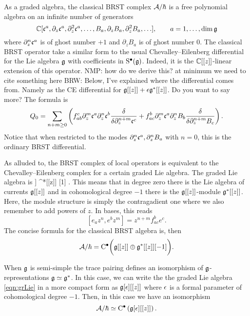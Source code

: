 \documentclass[11pt]{amsart}
\def\brian#1{{\textcolor{blue!65!red}{BRW: {#1}}}}
\def\natalie#1{{\textcolor{green!65!black}{NMP: {#1}}}}
\begin{document}
As a graded algebra, the classical BRST complex $\mathcal A / \hbar$ is a free polynomial algebra on an infinite number of generators
\[
\mathbb C[\mathfrak c^a, \partial_z \mathfrak c^a , \partial^2_z \mathfrak c^a, \ldots, B_a , \partial_z B_a , \partial_z^2 B_a, \ldots], \qquad {a=1, \ldots, \dim \mathfrak g} 
\]
where $\partial_z^n \mathfrak c^a$ is of ghost number $+1$ and $\partial_z B_a$ is of ghost number $0$. 
The classical BRST operator take a similar form to the usual Chevalley--Eilenberg differential for the Lie algebra $\mathfrak g$ with coefficients in ${\rm S}^\bullet (\mathfrak g)$. 
Indeed, it is the $\mathbb C[[z]]$-linear extension of this operator. \natalie{how do we derive this? at minimum we need to cite something here}
\brian{Below, I've explained where the differential comes from. 
Namely as the CE differential for $\mathfrak g[[z]] + \epsilon \mathfrak g^*[[z]]$.
Do you want to say more?}
The formula is
\[
Q_0 = \sum_{n +m \geq 0} \left(f_{ab}^c \partial_z^m \mathfrak c^a \partial_z^n \mathfrak c^b \frac{\delta}{\delta \partial_z^{n+m}\mathfrak c^c} + f_{ac}^b \partial_{z}^m \mathfrak c^a \partial_z^n B_b \frac{\delta}{\delta \partial_z^{n+m} B_c}\right) .
\] 
Notice that when restricted to the modes $\partial_z^n \mathfrak c^a, \partial_z^n B_a$ with $n=0$, this is the ordinary BRST differential. 

As alluded to, the BRST complex of local operators is equivalent to the Chevalley--Eilenberg complex for a certain graded Lie algebra.
The graded Lie algebra is
\beqn\label{eqn:grLie}
\fg[[z]] \oplus \fg^*[[z]] [1] .
\eeqn
This means that in degree zero there is the Lie algebra of currents $\mathfrak g[[z]]$ and in cohomological degree $-1$ there is the $\mathfrak g[[z]]$-module $\mathfrak g^*[[z]]$. 
Here, the module structure is simply the contragadient one where we also remember to add powers of $z$.
In bases, this reads
\[
[e_a z^n , e^b z^m] = z^{n+m} f_{ac}^{b} e^c  .
\]
The concise formula for the classical BRST algebra is, then
\[
\mathcal A / \hbar = {\rm C}^\bullet \bigg(\mathfrak g[[z]] \oplus \mathfrak g^*[[z]] [-1] \bigg) .
\] 

When $\mathfrak g$ is semi-simple the trace pairing defines an isomorphism of $\mathfrak g$-representations $\mathfrak g \simeq \mathfrak g^*$. 
In this case, we can write the the graded Lie algebra \eqref{eqn:grLie} in a more compact form as $\mathfrak g[\epsilon] [[z]]$ where $\epsilon$ is a formal parameter of cohomological degree $-1$. 
Then, in this case we have an isomorphism
\[
\mathcal A / \hbar \simeq {\rm C}^\bullet \left(\mathfrak g[\epsilon][[z]]\right) .
\]


%
%
\end{document}
